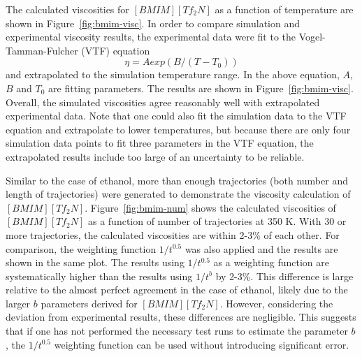 \documentclass[12pt]{article}
\begin{document}
The calculated viscosities for $[BMIM][Tf_2N]$ as a function of temperature are shown in Figure~\ref{fig:bmim-visc}.
In order to compare simulation and experimental viscosity results, the experimental data 
\cite{Gadzuric.JCED.57.1072.2012,
Katsuta.JCED.55.1588.2010,
Watanabe.JPCB.110.19593.2006,
Majer.GC.8.172.2006,
Watanabe.JPCB.109.6103.2005,
VanderNoot.JEC.568.167.2004}
were fit to the Vogel-Tamman-Fulcher (VTF) equation 
\cite{VTF}
\begin{equation}
{\eta = A exp(B/(T-T_0))  }
\label{eq:VTF}
\end{equation}
and  
extrapolated to the simulation temperature range.
In the above equation,
$A$, $B$ and $T_0$ are fitting parameters.
The results are shown in Figure~\ref{fig:bmim-visc}.
Overall, the simulated viscosities agree reasonably well with extrapolated experimental data. Note that one could also fit the simulation data to the VTF equation and extrapolate to lower temperatures, but because there are only four simulation data points to fit three parameters in the VTF equation, 
the extrapolated results include too large of an uncertainty to be reliable.

Similar to the case of ethanol,
more than enough trajectories (both number and length of trajectories) were generated
to demonstrate the viscosity calculation of $[BMIM][Tf_2N]$.
Figure~\ref{fig:bmim-num} shows the calculated viscosities of $[BMIM][Tf_2N]$ as a function of number of trajectories at 350 K.
With 30 or more trajectories,
the calculated viscosities are within 2-3\% of each other.
For comparison,
the weighting function $1/t^{0.5}$ was also applied and the results are shown in the same plot.
The results using $1/t^{0.5}$ as a weighting function are systematically higher than the results using $1/t^b$ by 2-3\%.
This difference is large relative to the almost perfect agreement in the case of ethanol,
likely due to the larger $b$ parameters derived for $[BMIM][Tf_2N]$.
However, considering the deviation from experimental results,
these differences are negligible. This suggests that if one has not performed the necessary test runs to estimate the parameter $b$, the 
$1/t^{0.5}$ weighting function can be used without introducing significant error.
\end{document}
